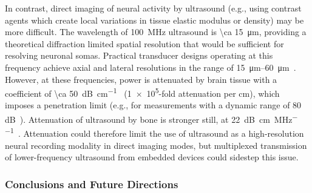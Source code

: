 In contrast, direct imaging of neural activity by ultrasound (e.g., using contrast agents which create local variations in tissue elastic modulus or density) may be more difficult.
The wavelength of \SI{100}{\mega\hertz} ultrasound is \SI{\ca 15}{\micro\meter}, providing a theoretical diffraction limited spatial resolution that would be sufficient for resolving neuronal somas.
Practical transducer designs operating at this frequency achieve axial and lateral resolutions in the range of \SIrange{15}{60}{\um}~\cite{foster00}.
However, at these frequencies, power is attenuated by brain tissue with a coefficient of \SI{\ca 50}{\dB\per\centi\meter}~\cite{hoskins10} (\num{1e5}-fold attenuation per cm), which imposes a penetration limit (e.g., for
measurements with a dynamic range of 80 dB~\cite{foster00}).
Attenuation of ultrasound by bone is stronger still, at \SI{22}{\dB\per\cm\per\MHz}~\cite{hoskins10}.
Attenuation could therefore limit the use of ultrasound as a high-resolution neural recording modality in direct imaging modes, but multiplexed transmission of lower-frequency ultrasound from embedded devices could sidestep this issue.

\subsubsection{Conclusions and Future Directions}

